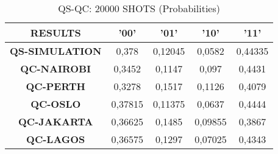 \begin{table}[!ht]
    \centering
    \begin{tabular}{ccccc}
    \hline
        \textbf{RESULTS} & \textbf{'00'} & \textbf{'01'} & \textbf{'10'} & \textbf{'11' } \\ \hline
        \textbf{QS-SIMULATION} & 0,378 & 0,12045 & 0,0582 & 0,44335  \\ 
        \textbf{QC-NAIROBI} & 0,3452 & 0,1147 & 0,097 & 0,4431  \\ 
        \textbf{QC-PERTH} & 0,3278 & 0,1517 & 0,1126 & 0,4079  \\ 
        \textbf{QC-OSLO} & 0,37815 & 0,11375 & 0,0637 & 0,4444  \\ 
        \textbf{QC-JAKARTA} & 0,36625 & 0,1485 & 0,09855 & 0,3867  \\ 
        \textbf{QC-LAGOS} & 0,36575 & 0,1297 & 0,07025 & 0,4343 \\ \hline
    \end{tabular}
    \caption{QS-QC: 20000 SHOTS (Probabilities)}
\end{table}





